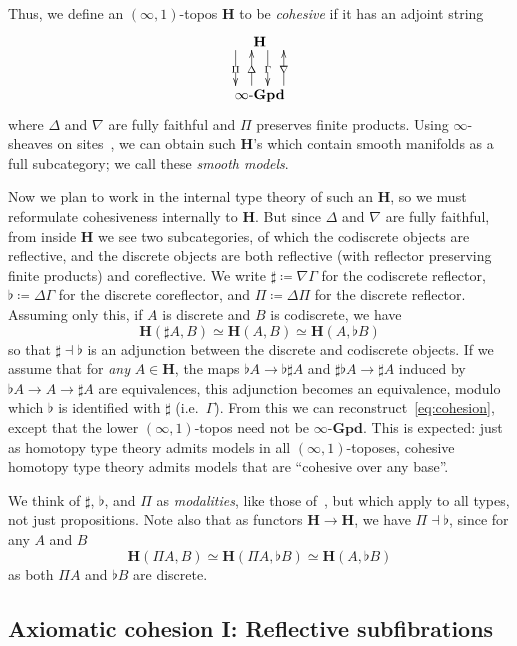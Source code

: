 \documentclass[copyright,12pt]{eptcs}
\newcommand{\ig}{\ensuremath{\infty\text{-}\mathbf{Gpd}}\xspace}
\renewcommand{\H}{\ensuremath{\mathbf{H}}\xspace}
\newcommand{\io}{\ensuremath{(\infty,1)}}
\begin{document}
Thus, we define an \io-topos \H to be \emph{cohesive} if it has an adjoint string
\begin{equation}
\vcenter{\xymatrix{
  \H \ar@<2mm>[d]|{\Gamma} \ar@<-6mm>[d]|{\Pi}\\
  \ig \ar@<2mm>[u]|{\Delta} \ar@<-6mm>[u]|{\nabla}
}}\label{eq:cohesion}
\end{equation}
where $\Delta$ and $\nabla$ are fully faithful and $\Pi$ preserves finite products.
Using $\infty$-sheaves on sites~\cite{CohesiveSites}, we can obtain such \H's which contain smooth manifolds as a full subcategory; we call these \emph{smooth models}.

Now we plan to work in the internal type theory of such an \H, so we must reformulate cohesiveness internally to \H.
But since $\Delta$ and $\nabla$ are fully faithful, from inside \H we see two subcategories, of which the codiscrete objects are reflective, and the discrete objects are both reflective (with reflector preserving finite products) and coreflective.
We write $\sharp \coloneqq \nabla\Gamma$ for the codiscrete reflector, $\flat \coloneqq \Delta\Gamma$ for the discrete coreflector, and $\Pi \coloneqq \Delta\Pi$ for the discrete reflector.
Assuming only this, if $A$ is discrete and $B$ is codiscrete, we have
\[ \H(\sharp A,B) \simeq \H(A,B) \simeq \H(A,\flat B) \]
so that $\sharp\dashv\flat$ is an adjunction between the discrete and codiscrete objects.
If we assume that for \emph{any} $A\in\H$, the maps $\flat A\to \flat\sharp A$ and $\sharp \flat A\to\sharp A$ induced by $\flat A\to A\to \sharp A$ are equivalences, this adjunction becomes an equivalence, modulo which $\flat$ is identified with $\sharp$ (i.e.\ $\Gamma$).
From this we can reconstruct~\eqref{eq:cohesion}, except that the lower \io-topos need not be \ig.
This is expected: just as homotopy type theory admits models in all \io-toposes, cohesive homotopy type theory admits models that are ``cohesive over any base''.

We think of $\sharp$, $\flat$, and $\Pi$ as \emph{modalities}, like those of~\cite{AB}, but which apply to all types, not just propositions.
Note also that as functors $\H\to \H$, we have $\Pi\dashv\flat$, since for any $A$ and $B$
\[ \H(\Pi A,B)\simeq \H(\Pi A,\flat B) \simeq \H(A,\flat B) \]
as both $\Pi A$ and $\flat B$ are discrete.


\subsection{Axiomatic cohesion I: Reflective subfibrations}
\label{sec:axiomatic-cohesion-i}
\end{document}
